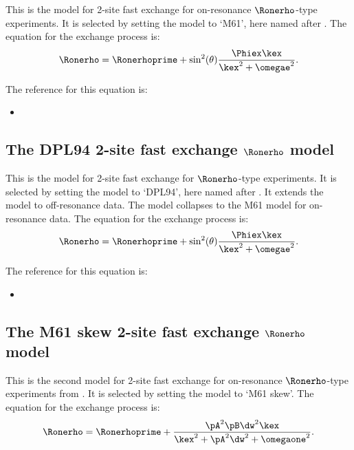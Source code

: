 This is the model for 2-site fast exchange for on-resonance $\Ronerho$-type experiments.  It is selected by setting the model to `M61', here named after \citet{Meiboom61}.  The equation for the exchange process is:
\begin{equation}
    \Ronerho = \Ronerhoprime + \sin^2(\theta) \frac{\Phiex\kex}{\kex^2 + \omegae^2} .
\end{equation}

The reference for this equation is:
\begin{itemize}
\item {}
\end{itemize}



\subsection{The DPL94 2-site fast exchange $\Ronerho$ model}
\label{sect: dispersion: DPL94 model}

This is the model for 2-site fast exchange for $\Ronerho$-type experiments.  It is selected by setting the model to `DPL94', here named after \citet{Davis94}.  It extends the \citet{Meiboom61} model to off-resonance data.  The model collapses to the M61 model for on-resonance data.  The equation for the exchange process is:
\begin{equation}
    \Ronerho = \Ronerhoprime + \sin^2(\theta) \frac{\Phiex\kex}{\kex^2 + \omegae^2} .
\end{equation}

The reference for this equation is:
\begin{itemize}
\item {}
\end{itemize}



\subsection{The M61 skew 2-site fast exchange $\Ronerho$ model}
\label{sect: dispersion: M61 skew model}

This is the second model for 2-site fast exchange for on-resonance $\Ronerho$-type experiments from \citet{Meiboom61}.  It is selected by setting the model to `M61 skew'.  The equation for the exchange process is:
\begin{equation}
    \Ronerho = \Ronerhoprime + \frac{\pA^2\pB\dw^2\kex}{\kex^2 + \pA^2\dw^2 + \omegaone^2} .
\end{equation}

